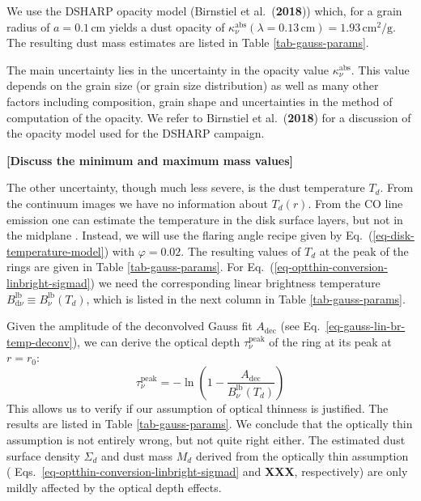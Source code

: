 \documentclass{aa}
\def\paperdsharpbirnstiel{Birnstiel et al.\ ({\bf 2018})}
\begin{document}
We use the DSHARP opacity model (\paperdsharpbirnstiel{}) which, for a grain
radius of $a=0.1\,\mathrm{cm}$ yields a dust opacity of
$\kappa_\nu^{\mathrm{abs}}(\lambda=0.13\,\mathrm{cm})=1.93\,\mathrm{cm}^2/\mathrm{g}$.
The resulting dust mass estimates are listed in Table \ref{tab-gauss-params}.

The main uncertainty lies in the uncertainty in the opacity value
$\kappa_\nu^{\mathrm{abs}}$. This value depends on the grain size (or grain size
distribution) as well as many other factors including composition, grain shape
and uncertainties in the method of computation of the opacity. We refer to
\paperdsharpbirnstiel{} for a discussion of the opacity model used for the
DSHARP campaign.

{\bf [Discuss the minimum and maximum mass values]}

The other uncertainty, though much less severe, is the dust temperature
$T_d$. From the continuum images we have no information about $T_d(r)$. From the
CO line emission one can estimate the temperature in the disk surface layers,
but not in the midplane \citep[see e.g.][]{2018ApJ...853..113W}. Instead, we
will use the flaring angle recipe given by Eq.~(\ref{eq-disk-temperature-model})
with $\varphi=0.02$. The resulting values of $T_d$ at the peak of the rings are
given in Table \ref{tab-gauss-params}. For
Eq.~(\ref{eq-optthin-conversion-linbright-sigmad}) we need the corresponding
linear brightness temperature $B_{\mathrm{d}\nu}^{\mathrm{lb}}\equiv B_\nu^{\mathrm{lb}}(T_d)$, which is listed in the
next column in Table \ref{tab-gauss-params}.

Given the amplitude of the deconvolved Gauss fit $A_{\mathrm{dec}}$ (see
Eq.~\ref{eq-gauss-lin-br-temp-deconv}), we can derive the optical depth
$\tau_\nu^{\mathrm{peak}}$ of the ring at its peak at $r=r_0$:
\begin{equation}\label{eq-tau-estimate}
\tau_\nu^{\mathrm{peak}} = -\ln\left(1-\frac{A_{\mathrm{dec}}}{B_{\nu}^{\mathrm{lb}}(T_d)}\right)
\end{equation}
This allows us to verify if our assumption of optical thinness is justified. The
results are listed in Table \ref{tab-gauss-params}.  We conclude that the
optically thin assumption is not entirely wrong, but not quite right either. The
estimated dust surface density $\Sigma_d$ and dust mass $M_d$ derived from the
optically thin assumption ( Eqs.~\ref{eq-optthin-conversion-linbright-sigmad}
and {\bf XXX}, respectively) are only mildly affected by the optical depth
effects.
\end{document}
